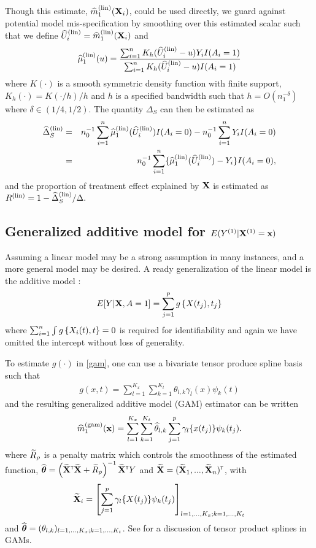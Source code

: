 \documentclass[useAMS,usenatbib,referee]{biom}
\begin{document}
Though this estimate, $\widehat{m}_1^{(\text{lin})}({\bf X}_i)$, could be used directly, we guard against potential model mis-specification by smoothing over this estimated scalar such that we define $\widehat U^{(\text{lin})}_i = \widehat{m}_1^{(\text{lin})}({\bf X}_i)$ and $$\widehat \mu_1^{(\text{lin})} (u) = \frac{\sum_{i=1}^n K_h(\widehat U^{(\text{lin})}_i - u) Y_i I(A_i = 1)}{\sum_{i=1}^n K_h(\widehat U^{(\text{lin})}_i - u)  I(A_i = 1)}$$
where $K(\cdot)$ is a smooth symmetric density function with finite support, $K_h(\cdot) = K(\cdot/h)/h$ and $h$ is a specified bandwidth such that $h= O(n_1^{-\delta})$ where $\delta \in (1/4,1/2).$ The quantity $\Delta_S$ can then be estimated as \begin{eqnarray*}
\widehat \Delta_S^{(\text{lin})} &=& n_0^{-1} \sum_{i=1}^n \widehat{\mu}_1^{(\text{lin})}(\widehat{U}^{(\text{lin})}_i) I(A_i = 0) - n_0^{-1}\sum_{i=1}^n Y_i I(A_i = 0) \\
&=& n_0^{-1} \sum_{i=1}^n \{ \widehat{\mu}_1^{(\text{lin})}(\widehat{U}^{(\text{lin})}_i) - Y_i\}I(A_i = 0),
\end{eqnarray*}
and the proportion of treatment effect explained by ${\bf X}$ is estimated as $R^{(\text{lin})} = 1-\widehat \Delta_S^{(\text{lin})} / \Delta.$

\subsection{Generalized additive model for $E(Y^{(1)}| {\bf X}^{(1)} ={\bf x})$ \label{gamsection}}
Assuming a linear model may be a strong assumption in many instances, and a more general model may be desired. A ready generalization of the linear model is the additive model \citep{mclean2014}:
\begin{align}
    E[Y | \bX, A = 1] = \sumjp g\left\{X(t_j),  t_j\right\} \label{gam}
\end{align}
where $\sum_{i=1}^n \int g\left\{X_i(t),  t\right\} = 0$ is required for identifiability and again we have omitted the intercept without loss of generality.

To estimate $g(\cdot)$ in \eqref{gam}, one can use a bivariate tensor produce spline basis such that
\begin{align*}
    g(x, t) = \sum_{l=1}^{K_x} \sum_{k=1}^{K_t} \theta_{l,k}\gamma_l(x)\psi_k(t)
\end{align*}
and the resulting generalized additive model (GAM) estimator can be written
\[
\widehat{m}_1^{(\text{gam})}({\bf x}) = \sum_{l=1}^{K_x} \sum_{k=1}^{K_t} {\widehat\theta}_{l,k}\sum_{j=1}^p \gamma_l\{x(t_j)\}\psi_k(t_j).
\]
where ${\widetilde R}_\rho$ is a penalty matrix which controls the smoothness of the estimated function, ${\widehat{\boldsymbol{\theta}}} = \left({\widetilde {{\bf X}}}^{{\sf \scriptscriptstyle{T}}}{\widetilde {{\bf X}}} + {\widetilde R}_\rho\right)^{-1}{\widetilde {{\bf X}}}^{{\sf \scriptscriptstyle{T}}} Y$ and ${\widetilde {{\bf X}}}  = ({\widetilde {{\bf X}}}_1, ..., {\widetilde {{\bf X}}}_n)^{{\sf \scriptscriptstyle{T}}}$, with 
\[{\widetilde {{\bf X}}}_i = \left[\sum_{j=1}^p \gamma_l\{X(t_j)\}\psi_k(t_j)\right]_{l=1,...,K_x;k=1,...,K_t}
\]
and ${\widehat{\boldsymbol{\theta}}} = (\theta_{l,k})_{l=1,...,K_x;k=1,...,K_t}$. See \cite{Wood2006} for a discussion of tensor product splines in GAMs.
\end{document}
